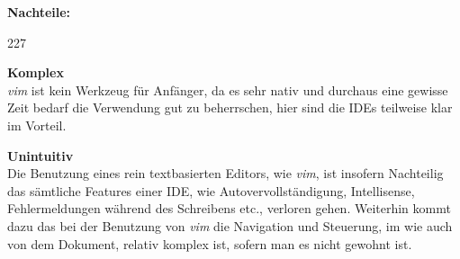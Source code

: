 \textbf{Nachteile:}
\begin{dinglist}{227}
	\item{\textbf{Komplex}}\\
	\textit{vim} ist kein Werkzeug f\"ur Anf\"anger, da es sehr nativ und durchaus eine gewisse Zeit bedarf die Verwendung gut zu beherrschen, hier sind die IDEs teilweise klar im Vorteil. 
	\item{\textbf{Unintuitiv}}\\
	Die Benutzung eines rein textbasierten Editors, wie \textit{vim}, ist insofern Nachteilig das s\"amtliche Features einer IDE, wie Autovervollst\"andigung, Intellisense, Fehlermeldungen w\"ahrend des Schreibens etc., verloren gehen. Weiterhin kommt dazu das bei der Benutzung von \textit{vim} die Navigation und Steuerung, im wie auch von dem Dokument, relativ komplex ist, sofern man es nicht gewohnt ist.
\end{dinglist}

